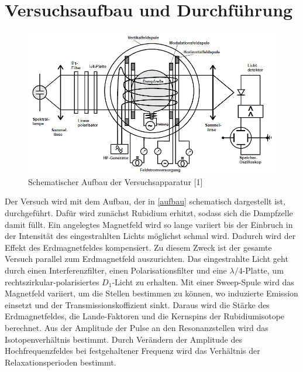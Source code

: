 \section{Versuchsaufbau und Durchführung}

\begin{figure}[h]
\centering
\includegraphics[width=\textwidth]{img/aufbau.png}
\caption{Schematischer Aufbau der Versuchsapparatur [1]}
\label{aufbau}
\end{figure}

Der Versuch wird mit dem Aufbau, der in \autoref{aufbau} schematisch dargestellt ist, durchgeführt. Dafür wird
zunächst Rubidium erhitzt, sodass sich die Dampfzelle damit füllt. Ein angelegtes Magnetfeld wird so lange variiert
bis der Einbruch in der Intensität des eingestrahlten Lichts möglichst schmal wird. Dadurch wird der Effekt des
Erdmagnetfeldes kompensiert. Zu diesem Zweck ist der gesamte Versuch parallel zum Erdmagnetfeld auszurichten. Das
eingestrahlte Licht geht durch einen Interferenzfilter, einen Polarisationsfilter und eine $\lambda/4$-Platte, um
rechtszirkular-polarisiertes $D_1$-Licht zu erhalten. Mit einer Sweep-Spule wird das Magnetfeld variiert, um die
Stellen bestimmen zu können, wo induzierte Emission einsetzt und der Transmissionskoffizient sinkt. Daraus wird die
Stärke des Erdmagnetfeldes, die Lande-Faktoren und die Kernspins der Rubidiumisotope berechnet. Aus der Amplitude
der Pulse an den Resonanzstellen wird das Isotopenverhältnis bestimmt. Durch Verändern der Amplitude des
Hochfrequenzfeldes bei festgehaltener Frequenz wird das Verhältnis der Relaxationsperioden bestimmt.
